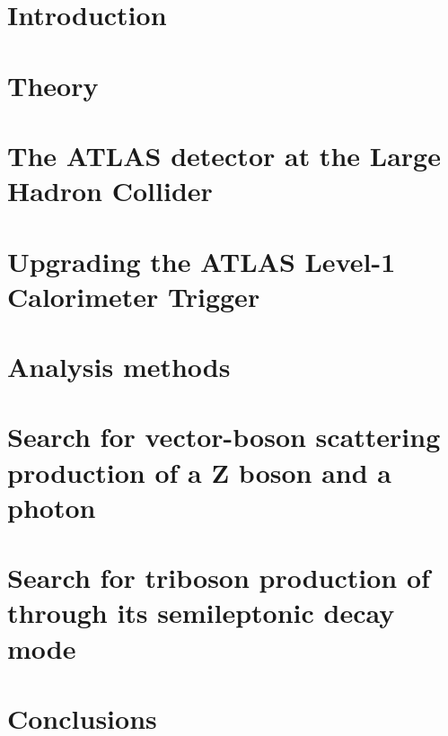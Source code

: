 \newcommand\relpath[1]{#1}
\newcommand\inputchapter[1]{}
\newcommand\resource[1]{#1}
\chapter*{Introduction}
\inputchapter{introduction}

\chapter{Theory}
\label{sec:theory}
\inputchapter{theory}

\chapter{The ATLAS detector at the Large Hadron Collider}
\label{sec:detector}
\inputchapter{detector}

\chapter{Upgrading the ATLAS Level-1 Calorimeter Trigger}
\label{sec:trig}
\inputchapter{l1calo}

\chapter{Analysis methods}
\label{sec:methods}
\inputchapter{analysis-common}

\chapter{Search for vector-boson scattering production of a Z boson and a photon}
\label{sec:vbs}
\inputchapter{vbs}

\chapter{Search for triboson production of \VZy through its semileptonic decay mode}
\label{sec:vzy}
\inputchapter{vzy}

\chapter*{Conclusions}
\inputchapter{conclusion}
